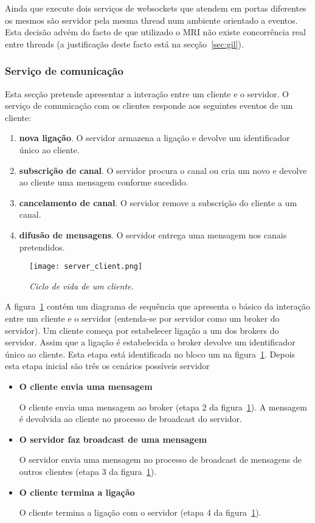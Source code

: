 Ainda que execute dois serviços de websockets que atendem em portas diferentes os mesmos são servidor pela mesma thread num ambiente orientado a eventos. Esta decisão advém do facto de que utilizado o MRI não existe concorrência real entre threads (a justificação deste facto está na secção~\ref{sec:gil}).

\subsubsection{Serviço de comunicação}

Esta secção pretende apresentar a interação entre um cliente e o servidor.
O serviço de comunicação com os clientes responde aos seguintes eventos de um cliente:

\begin{enumerate}
\item \textbf{nova ligação}. O servidor armazena a ligação e devolve um identificador único ao cliente.
\item \textbf{subscrição de canal}. O servidor procura o canal ou cria um novo e devolve ao cliente uma mensagem conforme sucedido.
\item \textbf{cancelamento de canal}. O servidor remove a subscrição do cliente a um canal.
\item \textbf{difusão de mensagens}. O servidor entrega uma mensagem nos canais pretendidos.
\end{enumerate}

\begin{figure}[H]
\centering
\texttt{[image: server\_client.png]}
\caption{\textit{Ciclo de vida de um cliente.}}
\label{fig:server-client}
\end{figure}

A figura~\ref{fig:server-client} contém um diagrama de sequência que apresenta o básico da interação entre um cliente e o servidor (entenda-se por servidor como um broker do servidor).
Um cliente começa por estabelecer ligação a um dos brokers do servidor. Assim que a ligação é estabelecida o broker devolve um identificador único ao cliente. Esta etapa está identificada no bloco um na figura~\ref{fig:server-client}. Depois esta etapa inicial são três os cenários possíveis servidor

\begin{itemize}
\item
\textbf{O cliente envia uma mensagem}

O cliente envia uma mensagem ao broker (etapa 2 da figura~\ref{fig:server-client}). A mensagem é devolvida ao cliente no processo de broadcast do servidor.

\item
\textbf{O servidor faz broadcast de uma mensagem}

O servidor envia uma mensagem no processo de broadcast de mensagens de outros clientes (etapa 3 da figura~\ref{fig:server-client}).

\item
\textbf{O cliente termina a ligação}

O cliente termina a ligação com o servidor (etapa 4 da figura~\ref{fig:server-client}).
\end{itemize}


